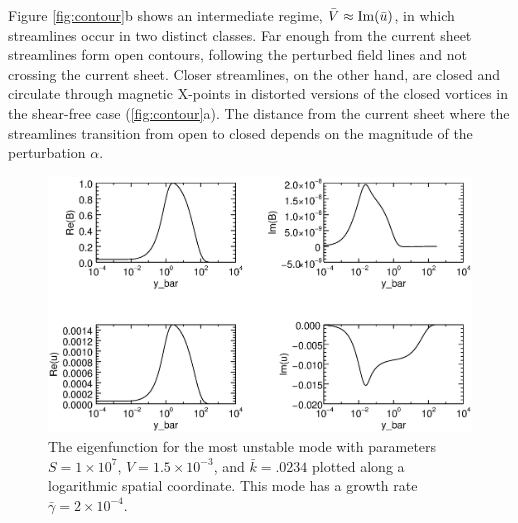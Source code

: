 	 Figure \ref{fig:contour}b shows an intermediate regime,  $\bar{V} \approx {\rm Im}(\bar{u})$, in which streamlines occur in two distinct classes. Far enough from the current sheet streamlines form open contours, following the perturbed field lines and not crossing the current sheet. Closer streamlines, on the other hand, are closed and circulate through magnetic X-points in distorted versions of the closed vortices in the shear-free case (\ref{fig:contour}a).  The distance from the current sheet where the streamlines transition from open to closed depends on the magnitude of the perturbation $\alpha$. 
	
	
	
	
	\begin{figure}[htbp]
		\centerline{\includegraphics[scale=.6]{ParkerLongcope2017/TM_eigenfunction.eps}}
		\caption{The eigenfunction for the most unstable mode with parameters $S = 1 \times 10^7$, $V = 1.5 \times 10^{-3}$, and $\bar{k} = .0234$ plotted along a logarithmic spatial coordinate. This mode has a growth rate $\bar{\gamma}= 2 \times 10^{-4}$. }
		\label{fig:eigen}
	\end{figure}
	
	
	
